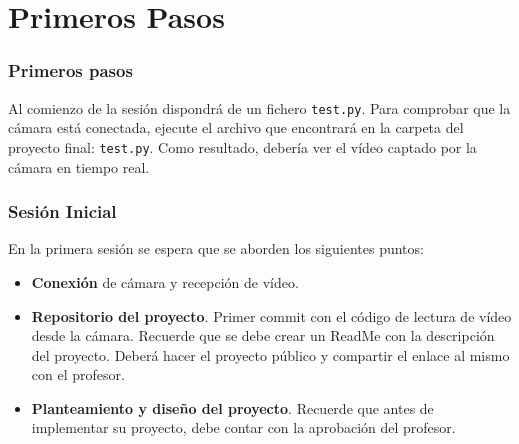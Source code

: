 \chapter{\textbf{Primeros Pasos}}
\label{chapter:primeros_pasos}

\subsection*{Primeros pasos}
{}
\vspace{5mm}

Al comienzo de la sesión dispondrá de un fichero \texttt{test.py}. Para comprobar que la cámara está conectada, ejecute el archivo que encontrará en la carpeta del proyecto final: \texttt{test.py}. Como resultado, debería ver el vídeo captado por la cámara en tiempo real.


\subsection*{Sesión Inicial}
{}
\vspace{5mm}
En la primera sesión se espera que se aborden los siguientes puntos:

\begin{itemize}
    \item \textbf{Conexión} de cámara y recepción de vídeo.
    \item \textbf{Repositorio del proyecto}. Primer commit con el código de lectura de vídeo desde la cámara. Recuerde que se debe crear un ReadMe con la descripción del proyecto. Deberá hacer el proyecto público y compartir el enlace al mismo con el profesor.
    \item  \textbf{Planteamiento y diseño del proyecto}. Recuerde que antes de implementar su proyecto, debe contar con la aprobación del profesor.
\end{itemize}